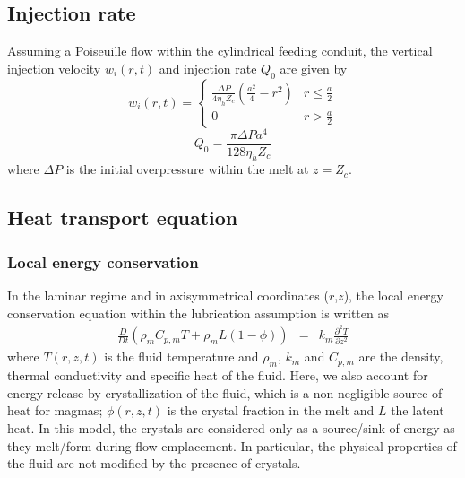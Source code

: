 \subsection{Injection rate}

Assuming a Poiseuille flow within the cylindrical feeding conduit, the
vertical  injection velocity  $w_i(r,t)$  and injection  rate $Q_0$  are
given by
\begin{equation}
  w_i(r,t)=
  \begin{cases}
    \frac{ \Delta P}{4 \eta_h Z_{c}} (\frac{a^{2}}{4}-r^{2})& r \le \frac{a}{2}\\
    0 & r > \frac{a}{2}
  \end{cases}
  \label{eq12}
\end{equation}
\begin{equation}
  Q_{0}=\frac{\pi \Delta P a^{4}}{128 \eta_h Z_c}
  \label{eq11}
\end{equation}
where  $\Delta P$  is  the  initial overpressure  within  the melt  at
$z=Z_{c}$. 

\subsection{Heat transport equation}
\subsubsection{Local energy conservation}

In the laminar regime and in axisymmetrical coordinates ($r$,$z$), the
local energy  conservation equation within the  lubrication assumption
is written as
\begin{eqnarray}
  \frac{D}{D t}\left(\rho_m C_{p,m} T+\rho_mL(1-\phi)\right)&=& k_m  \frac{\partial^2
                                                                T}{\partial               z^2}\label{EnergyCons}
\end{eqnarray}
where  $T(r,z,t)$ is  the fluid  temperature and  $\rho_m$, $k_m$  and
$C_{p,m}$ are the  density, thermal conductivity and  specific heat of
the fluid.  Here, we also account for energy release by crystallization of
the  fluid, which  is  a non  negligible source  of  heat for  magmas;
$\phi(r,z,t)$ is  the crystal fraction in  the melt and $L$  the latent
heat. In this model, the crystals are considered only as a source/sink
of energy as  they melt/form during flow  emplacement.  In particular,
the physical properties of the fluid  are not modified by the presence
of crystals.

